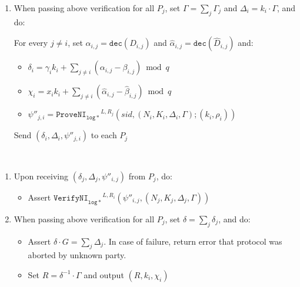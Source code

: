 \documentclass[11pt]{article}
\newcommand{\dec}{\ensuremath{\mathtt{dec}}}
\newcommand{\sid}{\ensuremath{\mathtt{sid}}}
\newcommand{\proveni}[1]{\ensuremath{\mathtt{ProveNI}_{\mathtt{#1}}}}
\newcommand{\verifyni}[1]{\ensuremath{\mathtt{VerifyNI}_{\mathtt{#1}}}}
\newcommand{\changed}[1]{\colorbox{Salmon}{$\displaystyle #1$}}
\newcommand{\?}[1]{\stackrel{?}{#1}}
\begin{document}
{\begin{description}
\begin{enumerate}
        \begin{itemize}
            \item Assert $\verifyni{aff\mbox{-}g}^{L,R_i}(\psi_{i,j}, \sid, (N_i, N_j, \changed{D_{i,j}, K_i}, F_{j,i}, \Gamma_j))$
            \item Assert $\verifyni{aff\mbox{-}g}^{L,R_i}(\hat{\psi}_{i,j}, \sid, (N_i, N_j, \changed{\hat{D}_{k,j}, K_i}, \hat{F}_{j,i}, X_j))$
            \item Assert $\verifyni{log*}^{L,R_i}(\psi'_{i,j}, \sid, (N_j, G_j, \Gamma_j, G))$
        \end{itemize}

        \item When passing above verification for all $P_j$, set $\Gamma = \sum_j \Gamma_j$ and $\Delta_i = k_i \cdot \Gamma$,
        and do:

        For every $j \ne i$, set $\alpha_{i,j} = \dec(D_{i,j})$ and $\hat{\alpha}_{i,j} = \dec(\hat{D}_{i,j})$ and:
        \begin{itemize}
            \item $\delta_i = \gamma_i k_i + \sum_{j \ne i}(\alpha_{i,j} - \beta_{i,j}) \bmod q$
            \item $\chi_i = x_i k_i + \sum_{j \ne i}(\hat{\alpha}_{i,j} - \hat{\beta}_{i,j}) \bmod q$
            \item $\psi''_{j,i} = \proveni{log*}^{L,R_j}(sid, (N_i, K_i, \Delta_i, \Gamma); (k_i, \rho_i))$
        \end{itemize}

        Send $(\delta_i, \Delta_i, \psi''_{j,i})$ to each $P_j$
    \end{enumerate}

    \item[\textbf{Output}] \
    \begin{enumerate}
        \item Upon receiving $(\delta_j, \Delta_j, \psi''_{i,j})$ from $P_j$, do:
        \begin{itemize}
            \item Assert $\verifyni{log*}^{L,R_i}(\psi''_{i,j}, (N_j, K_j, \Delta_j, \Gamma))$
        \end{itemize}

        \item When passing above verification for all $P_j$, set $\delta = \sum_j \delta_j$, and do:
        \begin{itemize}
            \item Assert $\delta \cdot G = \sum_j \Delta_j$. In case of failure, return error that protocol was aborted by unknown party.
            \item Set $R = \delta^{-1} \cdot \Gamma$ and output $(R, k_i, \chi_i)$
        \end{itemize}
    \end{enumerate}
\end{description}
}



\end{document}
